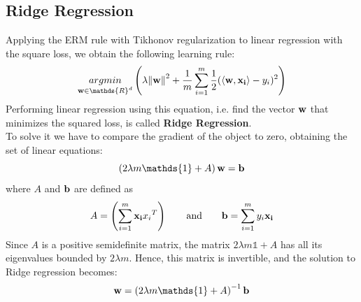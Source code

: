 \documentclass[12pt]{report}
\theoremstyle{plain}
\newcommand\sprod[2]{\langle \vb{#1},\vb{#2}\rangle}
\begin{document}
\begin{flushleft}
\subsection{Ridge Regression}
Applying the ERM rule with Tikhonov regularization to linear regression with the square loss, we obtain the following learning rule:
\[ \underset{\vb{w}\in\mathds{R}^d}{argmin} \left(\lambda\norm{\vb{w}}^2+\frac{1}{m}\sum_{i=1}^m\frac{1}{2}(\sprod{w}{x_i}-y_i)^2 \right) \]
Performing linear regression using this equation, i.e. find the vector $\vb{w}$ that minimizes the squared loss, is called \textbf{Ridge Regression}.\\
To solve it we have to compare the gradient of the object to zero, obtaining the set of linear equations:
\[ \left(2\lambda m\mathds{1}+A\right)\vb{w}=\vb{b} \]
where $A$ and $\vb{b}$ are defined as
\[ A=\left(\sum_{i=1}^m \vb{x_i}{x_i}^T \right) \qquad\text{and}\qquad \vb{b}=\sum_{i=1}^m y_i\vb{x_i} \]
Since $A$ is a positive semidefinite matrix, the matrix $2\lambda m\mathds{1} + A$ has all its eigenvalues bounded by $2\lambda m$. Hence, this matrix is invertible, and the solution to Ridge regression becomes:
\[ \vb{w}=\left(2\lambda m\mathds{1}+A\right)^{-1}\vb{b} \] 


\end{flushleft}
\end{document}
